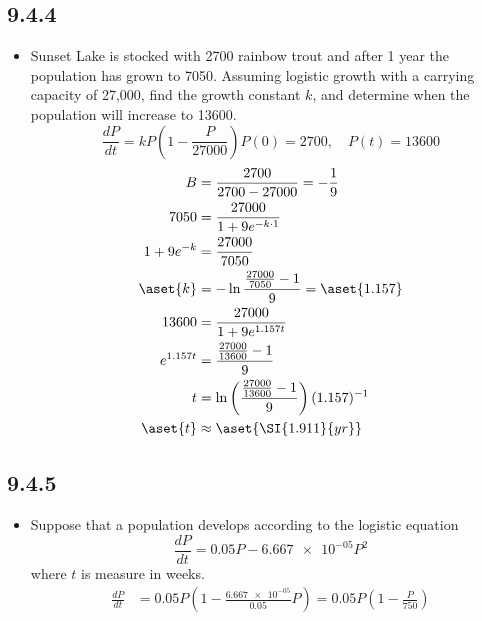\begin{itemize}
  \subsection{9.4.4}
  \begin{itemize}
    \item Sunset Lake is stocked with 2700 rainbow trout and after 1 year the
      population has grown to 7050. Assuming logistic growth with a carrying
      capacity of 27,000, find the growth constant \(k\), and determine when the
      population will increase to 13600.
      \[%
        \frac{dP}{dt} = kP\left( 1 - \frac{P}{27000}  \right)  P(0) = 2700,
        \quad P(t)=13600
      \]%
      \begin{align*}
        B &=\frac{2700}{2700 - 27000} = - \frac{1}{9} \\
        7050 &= \frac{27000}{1 + 9e^{-k\cdot1}} \\
        1 + 9e^{-k} &= \frac{27000}{7050} \\
        \aset{k} &= - \ln \frac{\frac{27000}{7050} - 1}{9} = \aset{1.157} \\
        13600 &= \frac{27000}{1+9e^{1.157t}}  \\
        e^{1.157t} &= \frac{\frac{27000}{13600}-1}{9} \\
        t &= \ln\left(\frac{\frac{27000}{13600}-1}{9}\right)(1.157)^{-1}\\
        \aset{t} &\approx \aset{\SI{1.911}{yr}}
      \end{align*}
  \end{itemize}

  \subsection{9.4.5}
  \begin{itemize}
    \item Suppose that a population develops according to the logistic equation
      \[%
        \frac{dP}{dt} = 0.05P - \num{6.667e-05}P^2
      \]%
      where \( t \) is measure in weeks.
      \begin{align*}
        \frac{dP}{dt} &= 0.05P\left(1 - \frac{\num{6.667e-05}}{0.05}P\right) =
        0.05P\left( 1 - \frac{P}{750} \right)
      \end{align*}
 \end{itemize}

\end{itemize}



